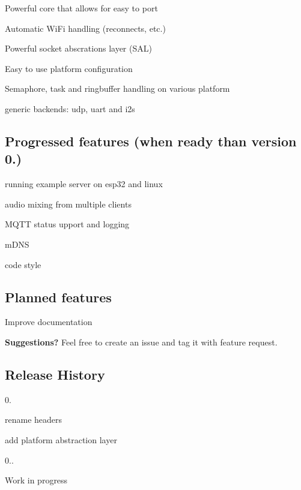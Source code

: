 \begin{DoxyItemize}
\item Powerful core that allows for easy to port
\item Automatic Wi\+Fi handling (reconnects, etc.)
\item Powerful socket abscrations layer (S\+AL)
\item Easy to use platform configuration
\item Semaphore, task and ringbuffer handling on various platform
\item generic backends\+: udp, uart and i2s
\end{DoxyItemize}

\subsection*{Progressed features (when ready than version 0.)}


\begin{DoxyItemize}
\item running example server on esp32 and linux
\item audio mixing from multiple clients
\item M\+Q\+TT status upport and logging
\item m\+D\+NS
\item code style
\end{DoxyItemize}

\subsection*{Planned features}


\begin{DoxyItemize}
\item Improve documentation
\item {\bfseries Suggestions?} Feel free to create an issue and tag it with feature request.
\end{DoxyItemize}

\subsection*{Release History}


\begin{DoxyItemize}
\item 0.
\begin{DoxyItemize}
\item rename headers
\item add platform abstraction layer
\end{DoxyItemize}
\item 0..
\begin{DoxyItemize}
\item Work in progress 
\end{DoxyItemize}
\end{DoxyItemize}